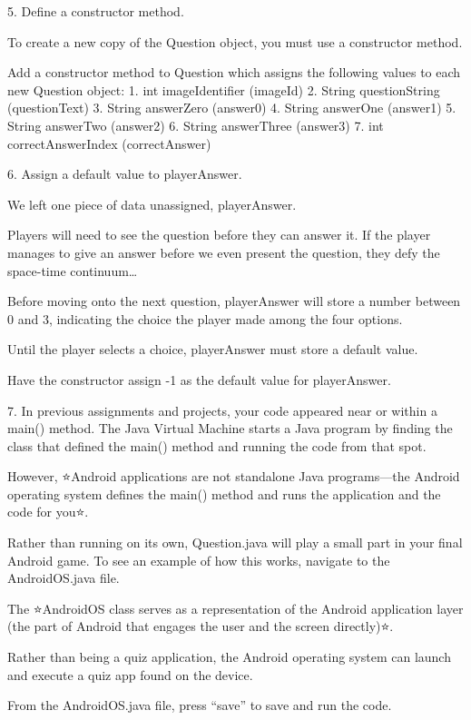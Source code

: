     5.
    Define a constructor method.

    To create a new copy of the Question object, you must use a constructor method.

    Add a constructor method to Question which assigns the following values to each new Question object:
        1. int imageIdentifier (imageId)
        2. String questionString (questionText)
        3. String answerZero (answer0)
        4. String answerOne (answer1)
        5. String answerTwo (answer2)
        6. String answerThree (answer3)
        7. int correctAnswerIndex (correctAnswer)

    6.
    Assign a default value to playerAnswer.

    We left one piece of data unassigned, playerAnswer.

    Players will need to see the question before they can answer it. If the player manages to give an answer before we even present the question, they defy the space-time continuum…

    Before moving onto the next question, playerAnswer will store a number between 0 and 3, indicating the choice the player made among the four options.

    Until the player selects a choice, playerAnswer must store a default value.

    Have the constructor assign -1 as the default value for playerAnswer.

    7.
    In previous assignments and projects, your code appeared near or within a main() method. The Java Virtual Machine starts a Java program by finding the class that defined the main() method and running the code from that spot.

    However, ⭐Android applications are not standalone Java programs—the Android operating system defines the main() method and runs the application and the code for you⭐.

    Rather than running on its own, Question.java will play a small part in your final Android game. To see an example of how this works, navigate to the AndroidOS.java file.

    The ⭐AndroidOS class serves as a representation of the Android application layer (the part of Android that engages the user and the screen directly)⭐.

    Rather than being a quiz application, the Android operating system can launch and execute a quiz app found on the device.

    From the AndroidOS.java file, press “save” to save and run the code.

